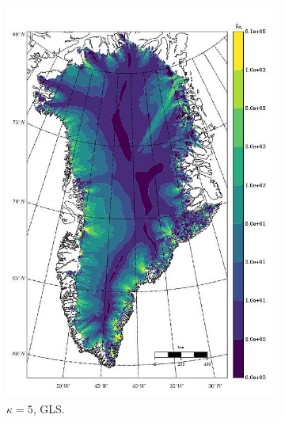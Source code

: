 \begin{figure}
  \begin{subfigure}[b]{0.25\linewidth}
    \includegraphics[width=\linewidth]{images/balance_velocity/greenland/Ubar_5H_kappa_5_GLS.jpg}
  \caption{$\kappa = 5$, GLS.}
  \label{greenland_bv_image_kappa_5_GLS}
  \end{subfigure}
  \begin{subfigure}[b]{0.25\linewidth}

\end{subfigure}
\end{figure}
